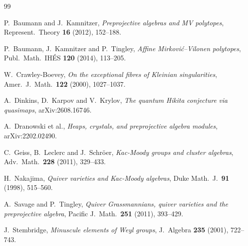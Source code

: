 \documentclass[11pt,reqno]{amsart}
\theoremstyle{plain}
\theoremstyle{definition}
\begin{document}
\begin{thebibliography}{99}

 P.~Baumann and J.~Kamnitzer, \emph{Preprojective algebras and MV
polytopes}, Represent.\ Theory \textbf{16} (2012), 152--188.

 P.~Baumann, J.~Kamnitzer and P.~Tingley, \emph{Affine
Mirkovi\'c--Vilonen polytopes}, Publ.\ Math.\ IH\'ES \textbf{120} (2014),
113--205.

 W.~Crawley-Boevey, \emph{On the exceptional fibres of Kleinian
singularities}, Amer.\ J.\ Math.\ \textbf{122} (2000), 1027--1037.

 A.~Dinkins, D.~Karpov and V.~Krylov, \emph{The quantum Hikita
conjecture via quasimaps}, arXiv:2608.16746.

 A.~Dranowski et al., \emph{Heaps, crystals, and
preprojective algebra modules}, arXiv:2202.02490.

 C.~Geiss, B.~Leclerc and J.~Schr\"oer, \emph{Kac-Moody groups
and cluster algebras}, Adv.\ Math.\ \textbf{228} (2011), 329--433.

 H.~Nakajima, \emph{Quiver varieties and Kac-Moody algebras},
Duke Math.\ J.\ \textbf{91} (1998), 515--560.

 A.~Savage and P.~Tingley, \emph{Quiver Grassmannians, quiver
varieties and the preprojective algebra}, Pacific J.\ Math.\ \textbf{251}
(2011), 393--429.

 J.~Stembridge, \emph{Minuscule elements of Weyl groups}, J.\
Algebra \textbf{235} (2001), 722--743.

\end{thebibliography}
\end{document}
